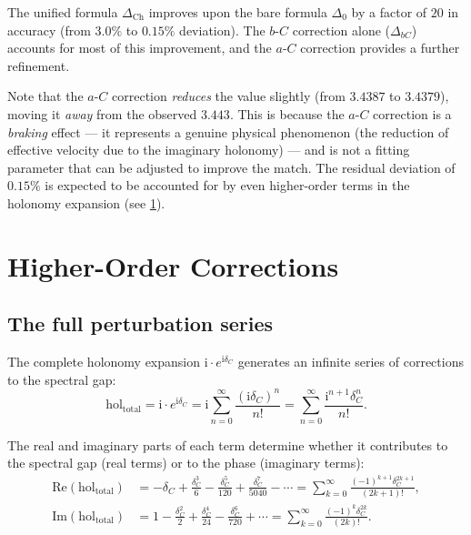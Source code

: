 \documentclass[12pt,a4paper]{article}
\theoremstyle{definition}
\theoremstyle{remark}
\newcommand{\hol}{\mathrm{hol}}
\newcommand{\ii}{\mathrm{i}}
\begin{document}
The unified formula $\Delta_{\mathrm{Ch}}$ improves upon the bare formula $\Delta_0$ by a factor of $20$ in accuracy (from $3.0\%$ to $0.15\%$ deviation). The $b$-$C$ correction alone ($\Delta_{bC}$) accounts for most of this improvement, and the $a$-$C$ correction provides a further refinement.

Note that the $a$-$C$ correction \emph{reduces} the value slightly (from $3.4387$ to $3.4379$), moving it \emph{away} from the observed $3.443$. This is because the $a$-$C$ correction is a \emph{braking} effect --- it represents a genuine physical phenomenon (the reduction of effective velocity due to the imaginary holonomy) --- and is not a fitting parameter that can be adjusted to improve the match. The residual deviation of $0.15\%$ is expected to be accounted for by even higher-order terms in the holonomy expansion (see \cref{sec:higher}).

\section{Higher-Order Corrections}
\label{sec:higher}

\subsection{The full perturbation series}

The complete holonomy expansion $\ii \cdot e^{\ii\delta_C}$ generates an infinite series of corrections to the spectral gap:
\begin{equation}
\hol_{\mathrm{total}} = \ii \cdot e^{\ii\delta_C} = \ii \sum_{n=0}^{\infty} \frac{(\ii\delta_C)^n}{n!} = \sum_{n=0}^{\infty} \frac{\ii^{n+1} \delta_C^n}{n!}.
\end{equation}

The real and imaginary parts of each term determine whether it contributes to the spectral gap (real terms) or to the phase (imaginary terms):
\begin{align}
\mathrm{Re}(\hol_{\mathrm{total}}) &= -\delta_C + \frac{\delta_C^3}{6} - \frac{\delta_C^5}{120} + \frac{\delta_C^7}{5040} - \cdots = \sum_{k=0}^{\infty} \frac{(-1)^{k+1} \delta_C^{2k+1}}{(2k+1)!}, \\
\mathrm{Im}(\hol_{\mathrm{total}}) &= 1 - \frac{\delta_C^2}{2} + \frac{\delta_C^4}{24} - \frac{\delta_C^6}{720} + \cdots = \sum_{k=0}^{\infty} \frac{(-1)^k \delta_C^{2k}}{(2k)!}.
\end{align}
\end{document}

